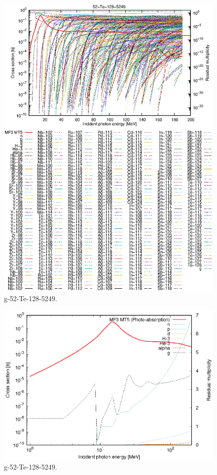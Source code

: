\begin{figure}
 \includegraphics[width=\linewidth]{eps/g_52-Te-128_5249.eps}
  \caption{g-52-Te-128-5249.}
\end{figure}
\newpage \clearpage

\begin{figure}
 \includegraphics[width=\linewidth]{eps-log/g_52-Te-128_5249.eps}
 \caption{g-52-Te-128-5249.}
\end{figure}
\newpage \clearpage

